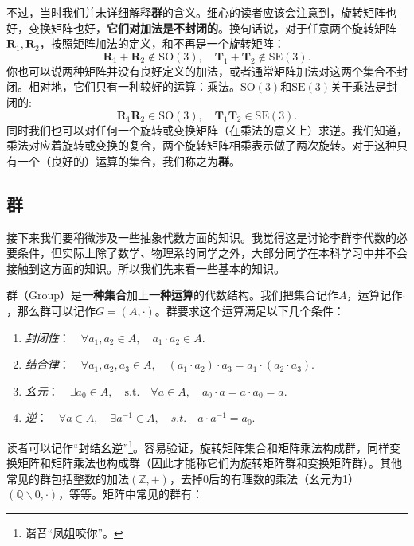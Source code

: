不过，当时我们并未详细解释\textbf{群}的含义。细心的读者应该会注意到，旋转矩阵也好，变换矩阵也好，\textbf{它们对加法是不封闭的}。换句话说，对于任意两个旋转矩阵$\bm{R}_1, \bm{R}_2$，按照矩阵加法的定义，和不再是一个旋转矩阵：
\begin{equation}
\bm{R}_1 + \bm{R}_2  \notin \mathrm{SO}(3), \quad \bm{T}_1 + \bm{T}_2  \notin \mathrm{SE}(3).
\end{equation}
你也可以说两种矩阵并没有良好定义的加法，或者通常矩阵加法对这两个集合不封闭。相对地，它们只有一种较好的运算：乘法。$\mathrm{SO}(3)$和$\mathrm{SE}(3)$关于乘法是封闭的:
\begin{equation}
\bm{R}_1 \bm{R}_2  \in \mathrm{SO}(3), \quad \bm{T}_1 \bm{T}_2  \in \mathrm{SE}(3).
\end{equation}
同时我们也可以对任何一个旋转或变换矩阵（在乘法的意义上）求逆。我们知道，乘法对应着旋转或变换的复合，两个旋转矩阵相乘表示做了两次旋转。对于这种只有一个（良好的）运算的集合，我们称之为\textbf{群}。

\subsection{群}
接下来我们要稍微涉及一些抽象代数方面的知识。我觉得这是讨论李群李代数的必要条件，但实际上除了数学、物理系的同学之外，大部分同学在本科学习中并不会接触到这方面的知识。所以我们先来看一些基本的知识。

群（Group）是\textbf{一种集合}加上\textbf{一种运算}的代数结构。我们把集合记作$A$，运算记作$\cdot$，那么群可以记作$G=(A,\cdot)$。群要求这个运算满足以下几个条件：

\begin{enumerate}
\item { \emph{封闭性}}：$ \quad \forall a_1, a_2 \in A, \quad a_1 \cdot a_2 \in A$.
\item { \emph{结合律}}：$ \quad \forall a_1, a_2, a_3 \in A, \quad (a_1 \cdot a_2) \cdot a_3 = a_1 \cdot ( a_2 \cdot a_3) $.
\item { \emph{幺元}}：$ \quad \exists a_0 \in A, \quad \mathrm{s.t.} \quad \forall a \in A, \quad a_0 \cdot a = a \cdot a_0 = a $.
\item { \emph{逆}}：$ \quad \forall a \in A, \quad \exists a^{-1} \in A, \quad s.t. \quad a \cdot a^{-1} = a_0 $.
\end{enumerate}

读者可以记作“封结幺逆”\footnote{谐音“凤姐咬你”。}。容易验证，旋转矩阵集合和矩阵乘法构成群，同样变换矩阵和矩阵乘法也构成群（因此才能称它们为旋转矩阵群和变换矩阵群）。其他常见的群包括整数的加法$(\mathbb{Z}, +)$，去掉0后的有理数的乘法（幺元为1）$(\mathbb{Q}\backslash 0, \cdot )$，等等。矩阵中常见的群有：

